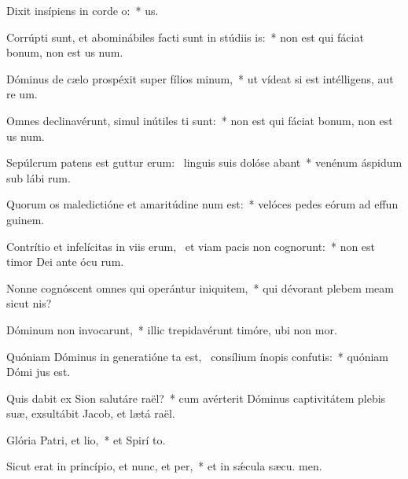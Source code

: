 \item Dixit insípiens in corde o:~*   us.
\item Corrúpti sunt, et abominábiles facti sunt in stúdiis is:~* non est qui fáciat bonum, non est us  num.
\item Dóminus de cælo prospéxit super fílios minum,~* ut vídeat si est intélligens, aut re um.
\item Omnes declinavérunt, simul inútiles ti sunt:~* non est qui fáciat bonum, non est us  num.
\item Sepúlcrum patens est guttur erum:~\pscross{} linguis suis dolóse abant~* venénum áspidum sub lábi rum.
\item Quorum os maledictióne et amaritúdine num est:~* velóces pedes eórum ad effun guinem.
\item Contrítio et infelícitas in viis erum,~\pscross{} et viam pacis non cognorunt:~* non est timor Dei ante ócu rum.
\item Nonne cognóscent omnes qui operántur iniquitem,~* qui dévorant plebem meam sicut  nis?
\item Dóminum non invocarunt,~* illic trepidavérunt timóre, ubi non  mor.
\item Quóniam Dóminus in generatióne ta est,~\pscross{} consílium ínopis confutis:~* quóniam Dómi  jus est.
\item Quis dabit ex Sion salutáre raël?~* cum avérterit Dóminus captivitátem plebis suæ, exsultábit Jacob, et lætá raël.
\item Glória Patri, et lio,~* et Spirí to.
\item Sicut erat in princípio, et nunc, et per,~* et in sǽcula sæcu. men.
